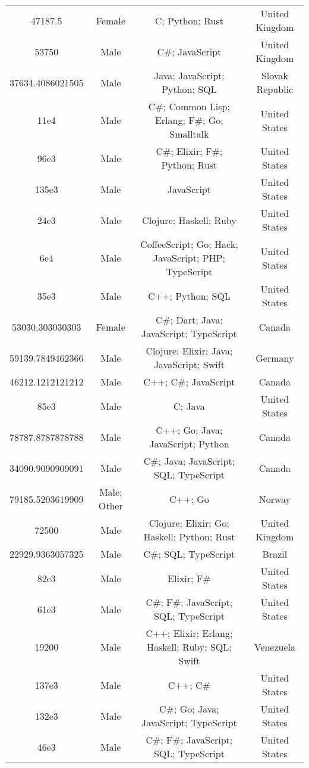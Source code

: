 \begin{center}
\begin{tabular}{ |c|c|c|c| }
47187.5  &  Female  &  C; Python; Rust  &  United Kingdom  \\ 
53750  &  Male  &  C\#; JavaScript  &  United Kingdom  \\ 
37634.4086021505  &  Male  &  Java; JavaScript; Python; SQL  &  Slovak Republic  \\ 
11e4  &  Male  &  C\#; Common Lisp; Erlang; F\#; Go; Smalltalk  &  United States  \\ 
96e3  &  Male  &  C\#; Elixir; F\#; Python; Rust  &  United States  \\ 
135e3  &  Male  &  JavaScript  &  United States  \\ 
24e3  &  Male  &  Clojure; Haskell; Ruby  &  United States  \\ 
6e4  &  Male  &  CoffeeScript; Go; Hack; JavaScript; PHP; TypeScript  &  United States  \\ 
35e3  &  Male  &  C++; Python; SQL  &  United States  \\ 
53030.303030303  &  Female  &  C\#; Dart; Java; JavaScript; TypeScript  &  Canada  \\ 
59139.7849462366  &  Male  &  Clojure; Elixir; Java; JavaScript; Swift  &  Germany  \\ 
46212.1212121212  &  Male  &  C++; C\#; JavaScript  &  Canada  \\ 
85e3  &  Male  &  C; Java  &  United States  \\ 
78787.8787878788  &  Male  &  C++; Go; Java; JavaScript; Python  &  Canada  \\ 
34090.9090909091  &  Male  &  C\#; Java; JavaScript; SQL; TypeScript  &  Canada  \\ 
79185.5203619909  &  Male; Other  &  C++; Go  &  Norway  \\ 
72500  &  Male  &  Clojure; Elixir; Go; Haskell; Python; Rust  &  United Kingdom  \\ 
22929.9363057325  &  Male  &  C\#; SQL; TypeScript  &  Brazil  \\ 
82e3  &  Male  &  Elixir; F\#  &  United States  \\ 
61e3  &  Male  &  C\#; F\#; JavaScript; SQL; TypeScript  &  United States  \\ 
19200  &  Male  &  C++; Elixir; Erlang; Haskell; Ruby; SQL; Swift  &  Venezuela  \\ 
137e3  &  Male  &  C++; C\#  &  United States  \\ 
132e3  &  Male  &  C\#; Go; Java; JavaScript; TypeScript  &  United States  \\ 
46e3  &  Male  &  C\#; F\#; JavaScript; SQL; TypeScript  &  United States  \\ 

\end{tabular}
\end{center}
